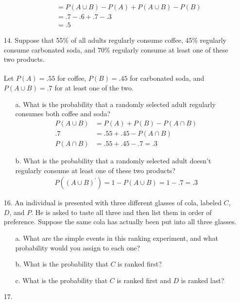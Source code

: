 \documentclass[letterpaper,12pt]{article}
\begin{document}
\begin{enumerate}
\begin{enumerate}
\begin{align*}
          &= P(A \cup B) - P(A) + P(A \cup B) - P(B) \\
          &= .7 - .6 + .7 - .3 \\
          &= .5
        \end{align*}
    \end{enumerate}
  \item[14.]
    Suppose that 55\% of all adults regularly consume coffee, 45\% regularly consume carbonated soda, and 70\% regularly consume at least one of these two products.
    \\ \\
    Let $P(A) = .55$ for coffee, $P(B) = .45$ for carbonated soda, and $P(A \cup B) = .7$ for at least one of the two.
    \begin{enumerate}
      \item[a.]
        What is the probability that a randomly selected adult regularly consumes both coffee and soda?
        \begin{align*}
          P(A \cup B) &= P(A) + P(B) - P(A \cap B) \\
          .7 &= .55 + .45 - P(A \cap B) \\
          P(A \cap B) &= .55 + .45 - .7 = .3
        \end{align*}
      \item[b.]
        What is the probability that a randomly selected adult doesn’t regularly consume at least one of these two products?
        \begin{align*}
          P((A \cup B)^\prime) = 1 - P(A \cup B) = 1 - .7 = .3
        \end{align*}
    \end{enumerate}
  \item[16.]
  An individual is presented with three different glasses of cola, labeled $C$, $D$, and $P$. He is asked to taste all three and then list them in order of preference. Suppose the same cola has actually been put into all three glasses.
  \begin{enumerate}
      \item[a.]
        What are the simple events in this ranking experiment, and what probability would you assign to each one?
      \item[b.]
        What is the probability that $C$ is ranked first?
      \item[c.]
        What is the probability that $C$ is ranked first and $D$ is ranked last?
    \end{enumerate}
  \item[17.]

\end{enumerate}
\end{document}
